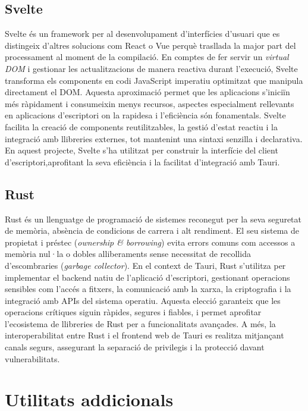 \subsection*{Svelte}
Svelte és un framework per al desenvolupament d'interfícies d'usuari que es distingeix d'altres solucions com React o Vue perquè trasllada la major part del processament al moment de la compilació. En comptes de fer servir un \emph{virtual DOM} i gestionar les actualitzacions de manera reactiva durant l'execució, Svelte transforma els components en codi JavaScript imperatiu optimitzat que manipula directament el DOM. Aquesta aproximació permet que les aplicacions s'iniciïn més ràpidament i consumeixin menys recursos, aspectes especialment rellevants en aplicacions d'escriptori on la rapidesa i l'eficiència són fonamentals. Svelte facilita la creació de components reutilitzables, la gestió d'estat reactiu i la integració amb llibreries externes, tot mantenint una sintaxi senzilla i declarativa. En aquest projecte, Svelte s'ha utilitzat per construir la interfície del client d'escriptori,aprofitant la seva eficiència i la facilitat d'integració amb Tauri.

\subsection*{Rust}
Rust és un llenguatge de programació de sistemes reconegut per la seva seguretat de memòria, absència de condicions de carrera i alt rendiment. El seu sistema de propietat i préstec (\emph{ownership \& borrowing}) evita errors comuns com accessos a memòria nul·la o dobles alliberaments sense necessitat de recollida d'escombraries (\emph{garbage collector}). En el context de Tauri, Rust s'utilitza per implementar el backend natiu de l'aplicació d'escriptori, gestionant operacions sensibles com l'accés a fitxers, la comunicació amb la xarxa, la criptografia i la integració amb APIs del sistema operatiu. Aquesta elecció garanteix que les operacions crítiques siguin ràpides, segures i fiables, i permet aprofitar l'ecosistema de llibreries de Rust per a funcionalitats avançades. A més, la interoperabilitat entre Rust i el frontend web de Tauri es realitza mitjançant canals segurs, assegurant la separació de privilegis i la protecció davant vulnerabilitats.

\section{Utilitats addicionals}

